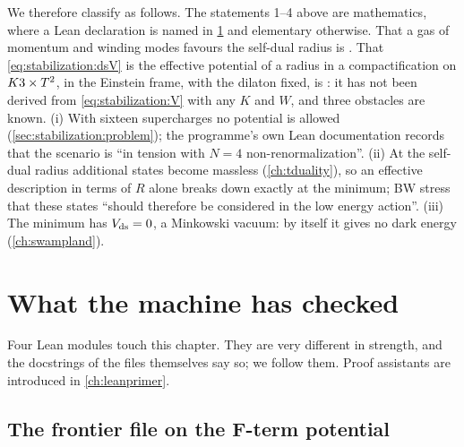 We therefore classify as follows. The statements 1--4 above are mathematics, \TA{} where a
Lean declaration is named in \cref{sec:stabilization:lean} and elementary otherwise. That a
gas of momentum and winding modes favours the self-dual radius is \TL. That
\eqref{eq:stabilization:dsV} is the effective potential of a radius in a compactification on
$K3\times T^2$, in the Einstein frame, with the dilaton fixed, is \TC: it has not been derived from
\eqref{eq:stabilization:V} with any $K$ and $W$, and three obstacles are known. (i) With
sixteen supercharges no potential is allowed (\cref{sec:stabilization:problem}); the
programme's own Lean documentation records that the scenario is ``in tension with $N=4$
non-renormalization''. (ii) At the self-dual radius additional states become massless
(\cref{ch:tduality}), so an effective description in terms of $R$ alone breaks down exactly
at the minimum; BW stress that these states ``should therefore be considered in the low energy
action''.  (iii) The minimum has $V_{\rm ds}=0$, a Minkowski
vacuum: by itself it gives no dark energy (\cref{ch:swampland}).

\section{What the machine has checked}\label{sec:stabilization:lean}

Four Lean modules touch this chapter. They are very different in strength, and the docstrings
of the files themselves say so; we follow them. Proof assistants are introduced in
\cref{ch:leanprimer}.

\subsection{The frontier file on the F-term potential}

